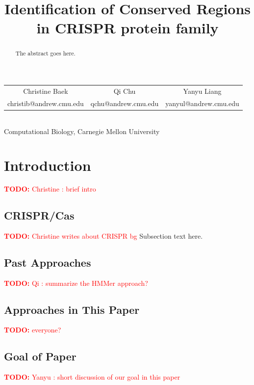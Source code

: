 \documentclass[11pt, oneside]{article}
\newcommand{\TODO}[1]{\textcolor{red}{\textbf{TODO: } #1}}
\begin{document}
\title{Identification of Conserved Regions\\ in CRISPR protein family}

\maketitle

\begin{center}
\begin{tabular}{ c c c }
 Christine Baek & Qi Chu & Yanyu Liang \\ 
christib@andrew.cmu.edu & qchu@andrew.cmu.edu & yanyul@andrew.cmu.edu \\     
\end{tabular}\\
\smallskip
\smallskip
Computational Biology, Carnegie Mellon University
\end{center}

\bigskip

\begin{abstract}
The abstract goes here.
\end{abstract}






\section{Introduction}

\TODO{Christine : brief intro}

\subsection{CRISPR/Cas} 
\TODO{Christine writes about CRISPR bg}
Subsection text here.

\subsection{Past Approaches}
\TODO{Qi : summarize the HMMer approach?}

\subsection{Approaches in This Paper}
\TODO{everyone?}

\subsection{Goal of Paper}
\TODO{Yanyu : short discussion of our goal in this paper}
\end{document}
